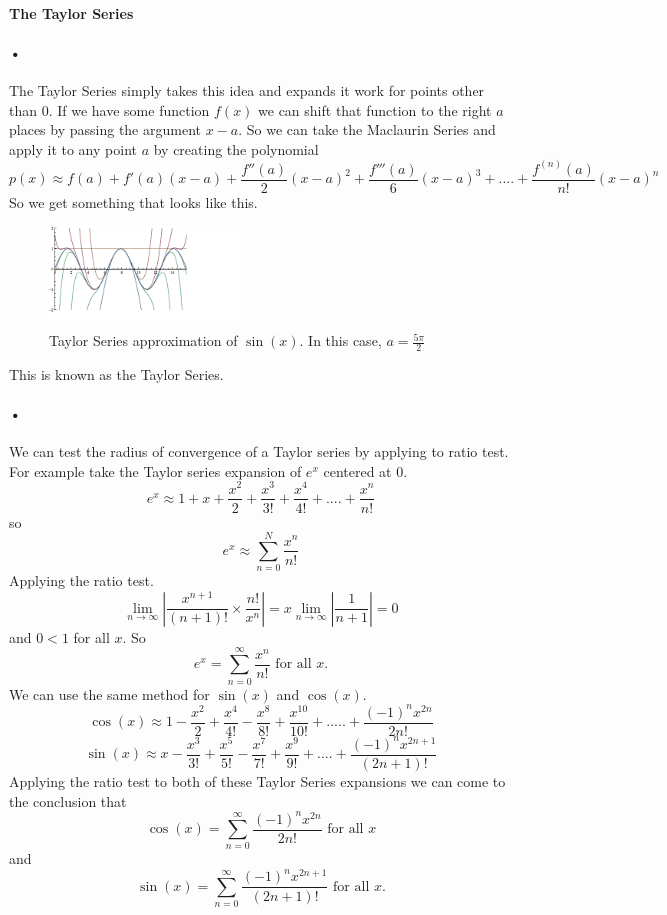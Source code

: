 \documentclass[font =22]{report}
\begin{document}
\paragraph{The Taylor Series}
\paragraph{•}
The Taylor Series simply takes this idea and expands it work for points other than $0$.
If we have some function $f(x)$ we can shift that function to the right $a$ places by passing the argument $x-a$. So we can take the Maclaurin Series and apply it to any point $a$ by creating the polynomial
\[
p(x) \approx f(a) + f'(a)(x-a) + \frac{f''(a)}{2}(x-a)^2 + \frac{f'''(a)}{6}(x-a)^3 +....+ \dfrac{f^{(n)}(a)}{n!}(x-a)^n
\]
So we get something that looks like this.
\begin{figure}[H]
\includegraphics[width=0.45\textwidth]{figures/Taylor2}
\caption{Taylor Series approximation of $\sin(x)$. In this case, $a=\frac{5\pi}{2}$}
\end{figure}
This is known as the Taylor Series.
\paragraph{•}
We can test the radius of convergence of a Taylor series by applying to ratio test.
For example take the Taylor series expansion of $e^x$ centered at 0.
\[
e^x \approx 1 + x + \frac{x^2}{2} + \frac{x^3}{3!} +\frac{x^4}{4!}+....+\frac{x^n}{n!}
\]
so 
\[
e^x \approx \sum_{n=0}^N \frac{x^n}{n!}
\]
Applying the ratio test.
\[
\lim_{n\to\infty} \left\lvert \frac{x^{n+1}}{(n+1)!} \times \frac{n!}{x^n}\right\rvert
=x\lim_{n\to\infty} \left\lvert \frac{1}{n+1} \right\rvert 
= 0
\]
and $0<1$ for all $x$. So
\[
e^x = \sum_{n=0}^\infty \frac{x^n}{n!} \text{ for all  }x.
\]
We can use the same method for $\sin(x)$ and $\cos(x)$.
\[
\cos(x) \approx 1 - \frac{x^2}{2} + \frac{x^4}{4!} - \frac{x^8}{8!} + \frac{x^{10}}{10!} +.....+\frac{(-1)^{n}x^{2n}}{2n!}
\]
\[
\sin(x) \approx x - \frac{x^3}{3!} + \frac{x^5}{5!} - \frac{x^7}{7!} + \frac{x^9}{9!} +....+ \frac{(-1)^nx^{2n+1}}{(2n+1)!}
\]
Applying the ratio test to both of these Taylor Series expansions we can come to the conclusion that 
\[
\cos(x) = \sum_{n=0}^\infty \frac{(-1)^{n}x^{2n}}{2n!} \text{ for all }x
\]
and
\[
\sin(x) = \sum_{n=0}^\infty \frac{(-1)^nx^{2n+1}}{(2n+1)!} \text{ for all }x.
\]
\end{document}
